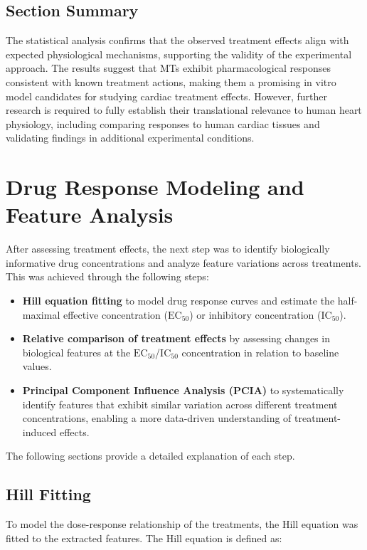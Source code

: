 \documentclass{report}
\begin{document}
    \subsection{Section Summary}
       The statistical analysis confirms that the observed treatment effects align with expected physiological mechanisms, supporting the validity of the experimental approach. The results suggest that MTs exhibit pharmacological responses consistent with known treatment actions, making them a promising in vitro model candidates for studying cardiac treatment effects. However, further research is required to fully establish their translational relevance to human heart physiology, including comparing responses to human cardiac tissues and validating findings in additional experimental conditions.
        
\newpage
\section{Drug Response Modeling and Feature Analysis}
\label{sec:drug-response-feature-analysis}
  After assessing treatment effects, the next step was to identify biologically informative drug concentrations and analyze feature variations across treatments. This was achieved through the following steps:
    \begin{itemize}
        \item \textbf{Hill equation fitting} to model drug response curves and estimate the half-maximal effective concentration (\(\text{EC}_{50}\)) or inhibitory concentration (\(\text{IC}_{50}\)).
        \item \textbf{Relative comparison of treatment effects} by assessing changes in biological features at the \(\text{EC}_{50}\)/\(\text{IC}_{50}\) concentration in relation to baseline values.
        \item \textbf{Principal Component Influence Analysis (PCIA)} to systematically identify features that exhibit similar variation across different treatment concentrations, enabling a more data-driven understanding of treatment-induced effects.
    \end{itemize}

    The following sections provide a detailed explanation of each step.


    \subsection{Hill Fitting} 
    \label{sec:hillfitting}
        To model the dose-response relationship of the treatments, the Hill equation was fitted to the extracted features. The Hill equation is defined as:
        
\end{document}
